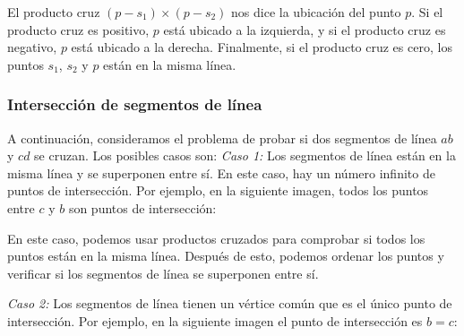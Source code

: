 El producto cruz $(p-s_1) \times (p-s_2)$
nos dice la ubicación del punto $p$.
Si el producto cruz es positivo,
$p$ está ubicado a la izquierda,
y si el producto cruz es negativo,
$p$ está ubicado a la derecha.
Finalmente, si el producto cruz es cero,
los puntos $s_1$, $s_2$ y $p$ están en la misma línea.

\subsubsection{Intersección de segmentos de línea}


A continuación, consideramos el problema de probar
si dos segmentos de línea
$ab$ y $cd$ se cruzan. Los posibles casos son:
\textit{Caso 1:}
Los segmentos de línea están en la misma línea
y se superponen entre sí.
En este caso, hay un número infinito de
puntos de intersección.
Por ejemplo, en la siguiente imagen,
todos los puntos entre $c$ y $b$ son
puntos de intersección:
\begin{center}
\end{center}

En este caso, podemos usar productos cruzados para
comprobar si todos los puntos están en la misma línea.
Después de esto, podemos ordenar los puntos y verificar
si los segmentos de línea se superponen entre sí.

\textit{Caso 2:}
Los segmentos de línea tienen un vértice común
que es el único punto de intersección.
Por ejemplo, en la siguiente imagen el
punto de intersección es $b=c$:

\begin{center}
\end{center}

